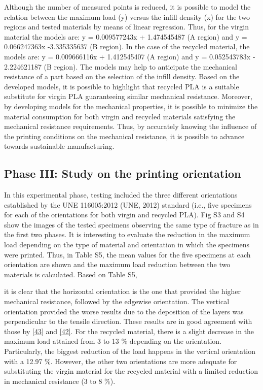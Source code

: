\documentclass[conference,final,]{IEEEtran}
\begin{document}
Although the number of measured points is reduced, it is possible to
model the relation between the maximum load (y) versus the infill
density (x) for the two regions and tested materials by means of linear
regression. Thus, for the virgin material the models are: y =
0.009577243x + 1.474545487 (A region) and y = 0.066247363x -3.335335637
(B region). In the case of the recycled material, the models are: y =
0.009666116x + 1.412545407 (A region) and y = 0.052543783x - 2.224621187
(B region). The models may help to anticipate the mechanical resistance
of a part based on the selection of the infill density. Based on the
developed models, it is possible to highlight that recycled PLA is a
suitable substitute for virgin PLA guaranteeing similar mechanical
resistance. Moreover, by developing models for the mechanical
properties, it is possible to minimize the material consumption for both
virgin and recycled materials satisfying the mechanical resistance
requirements. Thus, by accurately knowing the influence of the printing
conditions on the mechanical resistance, it is possible to advance
towards sustainable manufacturing.

\hypertarget{phase-iii-study-on-the-printing-orientation}{%
\subsection{Phase III: Study on the printing
orientation}\label{phase-iii-study-on-the-printing-orientation}}

In this experimental phase, testing included the three different
orientations established by the UNE 116005:2012 (UNE, 2012) standard
(i.e., five specimens for each of the orientations for both virgin and
recycled PLA). Fig S3 and S4 show the images of the tested specimens
observing the same type of fracture as in the first two phases. It is
interesting to evaluate the reduction in the maximum load depending on
the type of material and orientation in which the specimens were
printed. Thus, in Table S5, the mean values for the five specimens at
each orientation are shown and the maximum load reduction between the
two materials is calculated. Based on Table S5,

it is clear that the horizontal orientation is the one that provided the
higher mechanical resistance, followed by the edgewise orientation. The
vertical orientation provided the worse results due to the deposition of
the layers was perpendicular to the tensile direction. These results are
in good agreement with those by
\protect\hyperlink{ref-Corapi2019}{{[}43{]}} and
\protect\hyperlink{ref-Wang2020h}{{[}42{]}}. For the recycled material,
there is a slight decrease in the maximum load attained from 3 to 13 \%
depending on the orientation. Particularly, the biggest reduction of the
load happens in the vertical orientation with a 12.97 \%. However, the
other two orientations are more adequate for substituting the virgin
material for the recycled material with a limited reduction in
mechanical resistance (3 to 8 \%).
\end{document}
